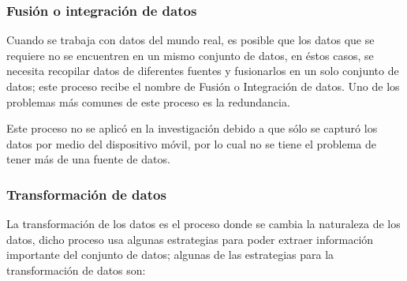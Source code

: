 \subsubsection{Fusi\'{o}n o integraci\'{o}n de datos}

Cuando se trabaja con datos del mundo real, es posible que los datos que se requiere no se encuentren en un mismo conjunto de datos, en \'{e}stos casos, se necesita recopilar datos de diferentes fuentes y fusionarlos en un solo conjunto de datos; este proceso recibe el nombre de Fusi\'{o}n o Integraci\'{o}n de datos. Uno de los problemas m\'{a}s comunes de este proceso es la redundancia. 

\vspace{5mm} %

Este proceso no se aplic\'{o} en la investigaci\'{o}n debido a que s\'{o}lo se captur\'{o} los datos por medio del dispositivo m\'{o}vil, por lo cual no se tiene el problema de tener m\'{a}s de una fuente de datos.

\subsubsection{Transformaci\'{o}n de datos}
\label{subsubsection:est-norm-dataset}

La transformaci\'{o}n de los datos es el proceso donde se cambia la naturaleza de los datos, dicho proceso usa algunas estrategias para poder extraer informaci\'{o}n importante del conjunto de datos; algunas de las estrategias para la transformaci\'{o}n de datos son: 

